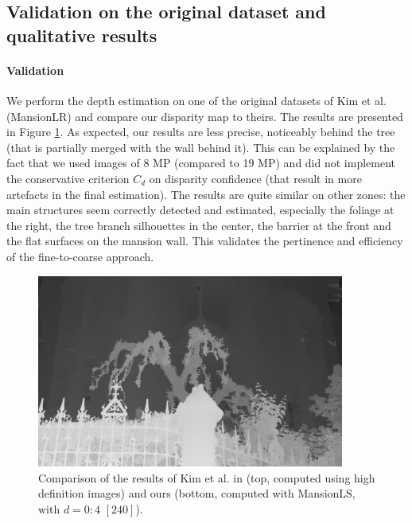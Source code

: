 \documentclass{article}
\theoremstyle{definition}
\begin{document}
\subsection{Validation on the original dataset and qualitative results}


\paragraph{Validation} We perform the depth estimation on one of the original datasets of Kim et al. (MansionLR) and compare our disparity map to theirs. The results are presented in Figure \ref{fig:comparison_kim}. As expected, our results are less precise, noticeably behind the tree (that is partially merged with the wall behind it). This can be explained by the fact that we used images of 8 MP (compared to 19 MP) and did not implement the conservative criterion $C_d$ on disparity confidence (that result in more artefacts in the final estimation). The results are quite similar on other zones: the main structures seem correctly detected and estimated, especially the foliage at the right, the tree branch silhouettes in the center, the barrier at the front and the flat surfaces on the mansion wall. This validates the pertinence and efficiency of the fine-to-coarse approach.


\begin{figure}[ht]
 \centering
 \includegraphics[width=0.9\textwidth]{images/mansion_kim_resized.png}
 \caption{Comparison of the results of Kim et al. in \cite{art:kim13:lfields} (top, computed using high definition images) and ours (bottom, computed with MansionLS, with $d=0:4$ $[240]$).}
 \label{fig:comparison_kim}
\end{figure}
\end{document}
